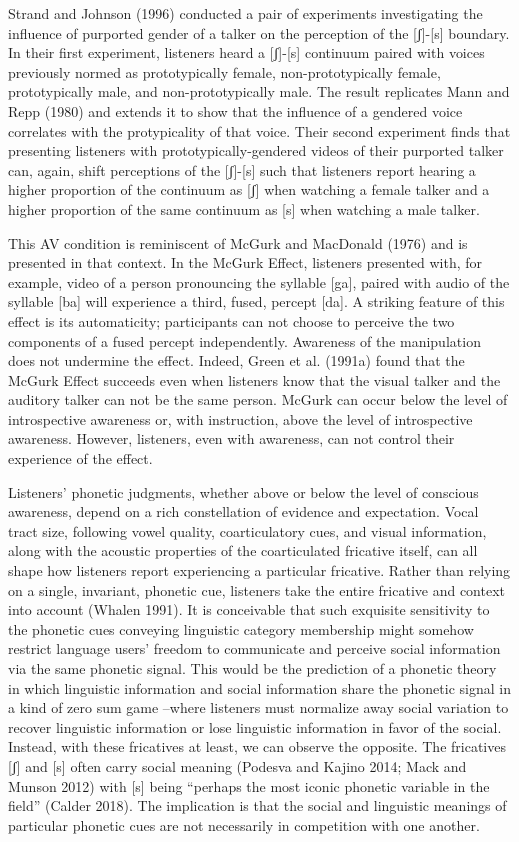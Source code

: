 \documentclass[
  letterpaper,
  DIV=11,
  numbers=noendperiod]{scrartcl}
\begin{document}
Strand and Johnson (1996) conducted a pair of experiments investigating
the influence of purported gender of a talker on the perception of the
{[}ʃ{]}-{[}s{]} boundary. In their first experiment, listeners heard a
{[}ʃ{]}-{[}s{]} continuum paired with voices previously normed as
prototypically female, non-prototypically female, prototypically male,
and non-prototypically male. The result replicates Mann and Repp (1980)
and extends it to show that the influence of a gendered voice correlates
with the protypicality of that voice. Their second experiment finds that
presenting listeners with prototypically-gendered videos of their
purported talker can, again, shift perceptions of the {[}ʃ{]}-{[}s{]}
such that listeners report hearing a higher proportion of the continuum
as {[}ʃ{]} when watching a female talker and a higher proportion of the
same continuum as {[}s{]} when watching a male talker.

This AV condition is reminiscent of McGurk and MacDonald (1976) and is
presented in that context. In the McGurk Effect, listeners presented
with, for example, video of a person pronouncing the syllable {[}ga{]},
paired with audio of the syllable {[}ba{]} will experience a third,
fused, percept {[}da{]}. A striking feature of this effect is its
automaticity; participants can not choose to perceive the two components
of a fused percept independently. Awareness of the manipulation does not
undermine the effect. Indeed, Green et al. (1991a) found that the McGurk
Effect succeeds even when listeners know that the visual talker and the
auditory talker can not be the same person. McGurk can occur below the
level of introspective awareness or, with instruction, above the level
of introspective awareness. However, listeners, even with awareness, can
not control their experience of the effect.

Listeners' phonetic judgments, whether above or below the level of
conscious awareness, depend on a rich constellation of evidence and
expectation. Vocal tract size, following vowel quality, coarticulatory
cues, and visual information, along with the acoustic properties of the
coarticulated fricative itself, can all shape how listeners report
experiencing a particular fricative. Rather than relying on a single,
invariant, phonetic cue, listeners take the entire fricative and context
into account (Whalen 1991). It is conceivable that such exquisite
sensitivity to the phonetic cues conveying linguistic category
membership might somehow restrict language users' freedom to communicate
and perceive social information via the same phonetic signal. This would
be the prediction of a phonetic theory in which linguistic information
and social information share the phonetic signal in a kind of zero sum
game --where listeners must normalize away social variation to recover
linguistic information or lose linguistic information in favor of the
social. Instead, with these fricatives at least, we can observe the
opposite. The fricatives {[}ʃ{]} and {[}s{]} often carry social meaning
(Podesva and Kajino 2014; Mack and Munson 2012) with {[}s{]} being
``perhaps the most iconic phonetic variable in the field'' (Calder
2018). The implication is that the social and linguistic meanings of
particular phonetic cues are not necessarily in competition with one
another.
\end{document}
